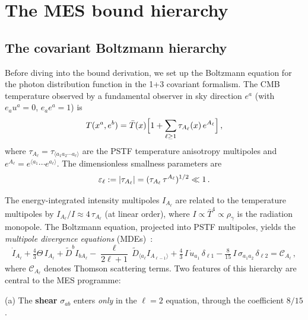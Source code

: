 \section{The MES bound hierarchy}\label{sec:MES}

\subsection{The covariant Boltzmann hierarchy}
\label{sec:boltzmann}

Before diving into the bound derivation, we set up the
Boltzmann equation for the photon distribution function in the
1+3 covariant formalism.  The CMB temperature observed by a
fundamental observer in sky direction $e^a$ (with
$e_a u^a = 0$, $e_a e^a = 1$) is
\begin{equation}\label{eq:T-expansion}
T(x^a, e^b) = \bar{T}(x)\Bigl[
  1 + \sum_{\ell \geq 1}
    \tau_{A_\ell}(x)\,e^{A_\ell}
\Bigr]\,,
\end{equation}
where $\tau_{A_\ell} = \tau_{\langle a_1 a_2 \cdots a_\ell
\rangle}$ are the PSTF temperature anisotropy multipoles and
$e^{A_\ell} = e^{\langle a_1}\cdots e^{a_\ell\rangle}$.  The
dimensionless smallness parameters are
\begin{equation}\label{eq:eps-def}
\varepsilon_\ell := |\tau_{A_\ell}|
= (\tau_{A_\ell}\,\tau^{A_\ell})^{1/2} \ll 1\,.
\end{equation}

The energy-integrated intensity multipoles $I_{A_\ell}$ are
related to the temperature multipoles by $I_{A_\ell}/I \approx
4\,\tau_{A_\ell}$ (at linear order), where
$I \propto \bar{T}^4 \propto \rho_\gamma$ is the radiation
monopole.  The Boltzmann equation, projected into PSTF
multipoles, yields the \emph{multipole divergence equations}
(MDEs)~\cite{MaartensGE1999,ChallinorLasenby1999}:
\begin{equation}\label{eq:MDE-general}
\dot{I}_{A_\ell}
+ \tfrac{4}{3}\Theta\,I_{A_\ell}
+ \tilde{D}^b I_{bA_\ell}
- \frac{\ell}{2\ell+1}\,\tilde{D}_{\langle a_\ell}
  I_{A_{\ell-1}\rangle}
+ \tfrac{4}{3}\,I\,\dot{u}_{a_1}\,\delta_{\ell 1}
- \tfrac{8}{15}\,I\,\sigma_{a_1 a_2}\,\delta_{\ell 2}
= \mathcal{C}_{A_\ell}\,,
\end{equation}
where $\mathcal{C}_{A_\ell}$ denotes Thomson scattering terms.
Two features of this hierarchy are central to the MES programme:

(a) The \textbf{shear} $\sigma_{ab}$ enters \emph{only} in the
$\ell = 2$ equation, through the coefficient $8/15$.

